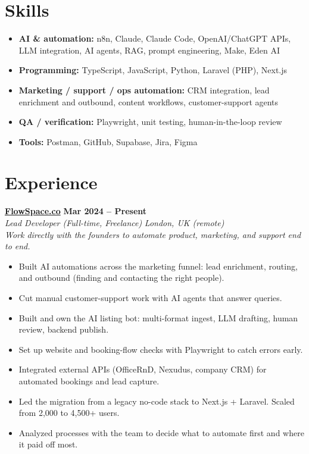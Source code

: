 \documentclass[a4paper,10pt]{article}
\newcommand{\role}[4]{%
 \textbf{#1} \hfill \textbf{#2}\\[1pt]%
 \textit{#3} \hfill \textit{#4}\\[2pt]%
}
\begin{document}
\section{Skills}
\begin{itemize}
 \item \textbf{AI \& automation:} n8n, Claude, Claude Code, OpenAI/ChatGPT APIs, LLM integration, AI agents, RAG, prompt engineering, Make, Eden AI
 \item \textbf{Programming:} TypeScript, JavaScript, Python, Laravel (PHP), Next.js
 \item \textbf{Marketing / support / ops automation:} CRM integration, lead enrichment and outbound, content workflows, customer-support agents
 \item \textbf{QA / verification:} Playwright, unit testing, human-in-the-loop review
 \item \textbf{Tools:} Postman, GitHub, Supabase, Jira, Figma
\end{itemize}

\section{Experience}

\role{\href{https://flowspace.co}{FlowSpace.co}}{Mar 2024 -- Present}{Lead Developer (Full-time, Freelance)}{London, UK (remote)}
\textit{Work directly with the founders to automate product, marketing, and support end to end.}
\begin{itemize}
 \item Built AI automations across the marketing funnel: lead enrichment, routing, and outbound (finding and contacting the right people).
 \item Cut manual customer-support work with AI agents that answer queries.
 \item Built and own the AI listing bot: multi-format ingest, LLM drafting, human review, backend publish.
 \item Set up website and booking-flow checks with Playwright to catch errors early.
 \item Integrated external APIs (OfficeRnD, Nexudus, company CRM) for automated bookings and lead capture.
 \item Led the migration from a legacy no-code stack to Next.js + Laravel. Scaled from 2,000 to 4,500+ users.
 \item Analyzed processes with the team to decide what to automate first and where it paid off most.
\end{itemize}
\end{document}
